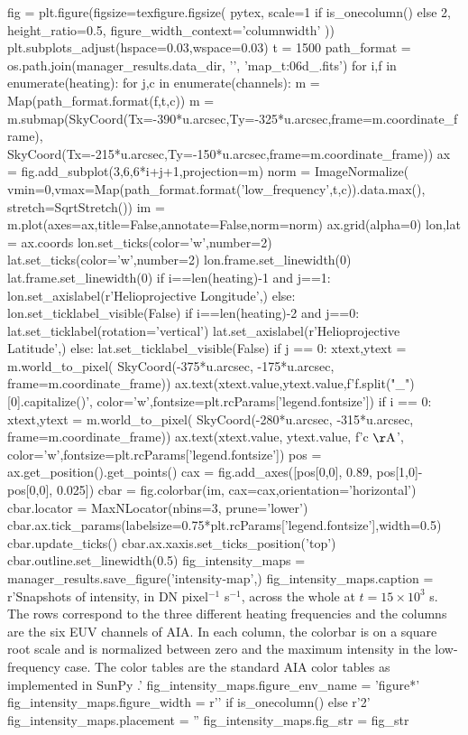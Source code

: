 \begin{pycode}
fig = plt.figure(figsize=texfigure.figsize(
    pytex,
    scale=1 if is_onecolumn() else 2,
    height_ratio=0.5, 
    figure_width_context='columnwidth'
))
plt.subplots_adjust(hspace=0.03,wspace=0.03)
t = 1500
path_format = os.path.join(manager_results.data_dir, '{}', 'map_t{:06d}_{}.fits')
for i,f in enumerate(heating):
    for j,c in enumerate(channels):
        m = Map(path_format.format(f,t,c))
        m = m.submap(SkyCoord(Tx=-390*u.arcsec,Ty=-325*u.arcsec,frame=m.coordinate_frame),
                     SkyCoord(Tx=-215*u.arcsec,Ty=-150*u.arcsec,frame=m.coordinate_frame))
        ax = fig.add_subplot(3,6,6*i+j+1,projection=m)
        norm = ImageNormalize(
            vmin=0,vmax=Map(path_format.format('low_frequency',t,c)).data.max(),
            stretch=SqrtStretch())
        im = m.plot(axes=ax,title=False,annotate=False,norm=norm)
        ax.grid(alpha=0)
        lon,lat = ax.coords
        lon.set_ticks(color='w',number=2)
        lat.set_ticks(color='w',number=2)
        lon.frame.set_linewidth(0)
        lat.frame.set_linewidth(0)
        if i==len(heating)-1 and j==1:
            lon.set_axislabel(r'Helioprojective Longitude',)
        else:
            lon.set_ticklabel_visible(False)
        if i==len(heating)-2 and j==0:
            lat.set_ticklabel(rotation='vertical')
            lat.set_axislabel(r'Helioprojective Latitude',)
        else:
            lat.set_ticklabel_visible(False)
        if j == 0:
            xtext,ytext = m.world_to_pixel(
                SkyCoord(-375*u.arcsec, -175*u.arcsec, frame=m.coordinate_frame))
            ax.text(xtext.value,ytext.value,f'{f.split("_")[0].capitalize()}',
                    color='w',fontsize=plt.rcParams['legend.fontsize'])
        if i == 0:
            xtext,ytext = m.world_to_pixel(
                SkyCoord(-280*u.arcsec, -315*u.arcsec, frame=m.coordinate_frame))
            ax.text(xtext.value, ytext.value, f'{c} $\mathrm{{\AA}}$',
                    color='w',fontsize=plt.rcParams['legend.fontsize'])
            pos = ax.get_position().get_points()
            cax = fig.add_axes([pos[0,0], 0.89, pos[1,0]-pos[0,0], 0.025])
            cbar = fig.colorbar(im, cax=cax,orientation='horizontal')
            cbar.locator = MaxNLocator(nbins=3, prune='lower')
            cbar.ax.tick_params(labelsize=0.75*plt.rcParams['legend.fontsize'],width=0.5)
            cbar.update_ticks()
            cbar.ax.xaxis.set_ticks_position('top')
            cbar.outline.set_linewidth(0.5)
fig_intensity_maps = manager_results.save_figure('intensity-map',)
fig_intensity_maps.caption = r'Snapshots of intensity, in DN pixel$^{-1}$ s$^{-1}$, across the whole \AR{} at $t=15\times10^3$ s. The rows correspond to the three different heating frequencies and the columns are the six EUV channels of AIA. In each column, the colorbar is on a square root scale and is normalized between zero and the maximum intensity in the low-frequency case. The color tables are the standard AIA color tables as implemented in SunPy \citep{sunpy_community_sunpypython_2015}.'
fig_intensity_maps.figure_env_name = 'figure*'
fig_intensity_maps.figure_width = r'\columnwidth' if is_onecolumn() else r'2\columnwidth'
fig_intensity_maps.placement = ''
fig_intensity_maps.fig_str = fig_str
\end{pycode}
